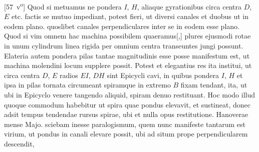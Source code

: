 [57~v\textsuperscript{o}]
\pend
\pstart%
Quod si metuamus ne pondera\protect{}  $I$, $H$, aliaque gyrationibus circa  
centra $D$, $E$ etc. factis se mutuo impediant, potest fieri, ut diversi canales et duobus  ut in eodem plano.  quoslibet canales perpendiculares inter se in eodem esse plano. Quod si vim omnem hac machina\protect{} possibilem quaeramus[,]
 plures ejusmodi rotae in unum cylindrum linea rigida per omnium centra transeuntes jungi possunt. 
\pend 
\pstart 
Elateria\protect{} autem pondera pilas\protect{} tantae magnitudinis esse posse manifestum est, ut machina\protect{} molendini\protect{} locum supplere possit.
\pend 
\pstart 
Potest et elegantius res ita institui, ut circa centra $D$, $E$ radios $EI$, $DH$ sint Epicycli cavi, in quibus pondera $I$, $H$ et ipsa in pilas tornata circumeant spiramque in extremo $B$ fixam tendant, ita, ut ubi in Epicyclo  venere tangendo aliquid, spiram denuo restituant. Hoc modo illud quoque commodum habebitur ut spira\protect{} quae pondus elevavit, et sustineat, donec adsit tempus tendendae rursus spirae, ubi et nulla opus restitutione. 
\pend
\vspace*{1.0em}%
\pstart%
 Hanoverae mense Majo.
\newline%
\noindent%
sciebam inesse paralogismum,
quem nunc manifeste 
tantarum est virium, ut pondus
in canali elevare possit, ubi ad situm prope perpendicularem descendit,
